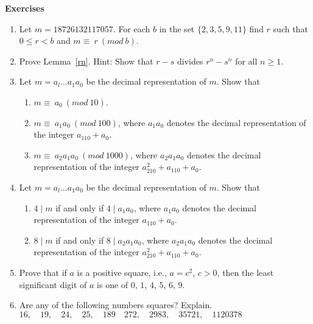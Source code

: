 \documentclass[12pt,letterpaper]{book}
\begin{document}
\textbf{Exercises}

\begin{enumerate}
\item{Let $m=18726132117057$. For each $b$ in the set $\{2,3,5,9,11\}$ find $r$ such that $0\leq r<b$ and $m\equiv~r~(mod~b)$.}

\item{Prove Lemma~\ref{rn}.  Hint: Show that $r-s$ divides $r^n-s^n$ for all $n\geq 1$.}

\item{Let $m=a_l\ldots a_1a_0$ be the decimal representation of $m$.
Show that 
\begin{enumerate}
\item  $m\equiv~a_0~(mod~10)$.

\item  $m\equiv~a_1a_0~(mod~100)$, where $a_1a_0$ denotes the decimal representation of the integer $a_110+a_0$.

\item  $m\equiv~a_2a_1a_0~(mod~1000)$, where $a_2a_1a_0$ denotes the decimal representation of the integer $a_210^2+a_110+a_0$.

\end{enumerate}}

\item{Let $m=a_l\ldots a_1a_0$ be the decimal representation of $m$.
Show that 
\begin{enumerate}
\item $4\mid m$ if and only if $4\mid a_1a_0$, where $a_1a_0$ denotes the decimal representation of the integer $a_110+a_0$.
\item $8\mid m$ if and only if $8\mid a_2a_1a_0$, where $a_2a_1a_0$ denotes the decimal representation of the integer $a_210^2+a_110+a_0$.
\end{enumerate}}

\item{Prove that if $a$ is a positive square, i.e., $a=c^2$, $c>0$,
then the least significant digit of $a$ is one of $0$, $1$, $4$, $5$,
$6$, $9$. %
}

\item{Are any of the following numbers squares? Explain.\\
$16, \quad 19, \quad 24, \quad 25, \quad 189 \quad 272,\quad 2983,\quad
35721,\quad 1120378$}


\end{enumerate}
\end{document}
